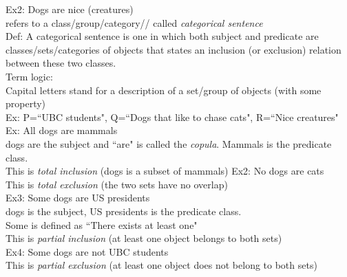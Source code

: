 Ex2: Dogs are nice (creatures)\\
refers to a class/group/category//
called \textit{categorical sentence}\\
Def: A categorical sentence is one in which both subject and predicate are classes/sets/categories of objects that states an inclusion (or exclusion) relation between these two classes.\\

Term logic:\\
Capital letters stand for a description of a set/group of objects (with some property)\\
Ex: P=``UBC students", Q=``Dogs that like to chase cats", R=``Nice creatures"\\

Ex: All dogs are mammals\\
dogs are the subject and ``are" is called the \textit{copula}. Mammals is the predicate class.\\
This is \textit{total inclusion} (dogs is a subset of mammals)
Ex2: No dogs are cats\\
This is \textit{total exclusion} (the two sets have no overlap)\\
Ex3: Some dogs are US presidents\\
dogs is the subject, US presidents is the predicate class.\\
Some is defined as ``There exists at least one"\\
This is \textit{partial inclusion} (at least one object belongs to both sets)\\
Ex4: Some dogs are not UBC students\\
This is \textit{partial exclusion} (at least one object does not belong to both sets)\\

